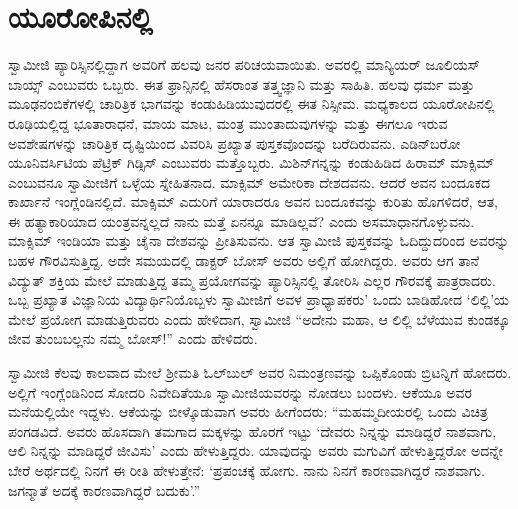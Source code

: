 
\chapter{ಯೂರೋಪಿನಲ್ಲಿ}

 ಸ್ವಾಮೀಜಿ ಪ್ಯಾರಿಸ್ಸಿನಲ್ಲಿದ್ದಾಗ ಅವರಿಗೆ ಹಲವು ಜನರ ಪರಿಚಯವಾಯಿತು. ಅವರಲ್ಲಿ ಮಾನ್ಯಿಯರ್ ಜೂಲಿಯಸ್ ಬಾಯ್ಸ್ ಎಂಬುವರು ಒಬ್ಬರು. ಈತ ಫ್ರಾನ್ಸಿನಲ್ಲಿ ಹೆಸರಾಂತ ತತ್ತ್ವಜ್ಞಾನಿ ಮತ್ತು ಸಾಹಿತಿ. ಹಲವು ಧರ್ಮ ಮತ್ತು ಮೂಢನಂಬಿಕೆಗಳಲ್ಲಿ ಚಾರಿತ್ರಿಕ ಭಾಗವನ್ನು ಕಂಡುಹಿಡಿಯುವುದರಲ್ಲಿ ಈತ ನಿಸ್ಸೀಮ. ಮಧ್ಯಕಾಲದ ಯೂರೋಪಿನಲ್ಲಿ ರೂಢಿಯಲ್ಲಿದ್ದ ಭೂತಾರಾಧನೆ, ಮಾಯ ಮಾಟ, ಮಂತ್ರ ಮುಂತಾದುವುಗಳನ್ನು ಮತ್ತು ಈಗಲೂ ಇರುವ ಅವಶೇಷಗಳನ್ನು ಚಾರಿತ್ರಿಕ ದೃಷ್ಟಿಯಿಂದ ವಿವರಿಸಿ ಪ್ರಖ್ಯಾತ ಪುಸ್ತಕವೊಂದನ್ನು ಬರೆದಿರುವನು. ಎಡಿನ್‍ಬರೋ ಯೂನಿವರ್ಸಿಟಿಯ ಪೆಟ್ರಿಕ್ ಗಿಡ್ಸಿಸ್ ಎಂಬುವರು ಮತ್ತೊಬ್ಬರು. ಮಿಶಿನ್‍ಗನ್ನನ್ನು ಕಂಡುಹಿಡಿದ ಹಿರಾಮ್ ಮಾಕ್ಸಿಮ್ ಎಂಬುವನೂ ಸ್ವಾಮೀಜಿಗೆ ಒಳ್ಳೆಯ ಸ್ನೇಹಿತನಾದ. ಮಾಕ್ಸಿಮ್ ಅಮೇರಿಕಾ ದೇಶದವನು. ಆದರೆ ಅವನ ಬಂದೂಕದ ಕಾರ್ಖಾನೆ ಇಂಗ್ಲೆಂಡಿನಲ್ಲಿದೆ. ಮಾಕ್ಸಿಮ್ ಎದುರಿಗೆ ಯಾರಾದರೂ ಅವನ ಬಂದೂಕವನ್ನು ಕುರಿತು ಹೊಗಳಿದರೆ, ಆತ, ಈ ಹತ್ಯಾಕಾರಿಯಾದ ಯಂತ್ರವನ್ನಲ್ಲದೆ ನಾನು ಮತ್ತೆ ಏನನ್ನೂ ಮಾಡಿಲ್ಲವೆ? ಎಂದು ಅಸಮಾಧಾನಗೊಳ್ಳುವನು. ಮಾಕ್ಸಿಮ್ ಇಂಡಿಯಾ ಮತ್ತು ಚೈನಾ ದೇಶವನ್ನು ಪ್ರೀತಿಸುವನು. ಆತ ಸ್ವಾಮೀಜಿ ಪುಸ್ತಕವನ್ನು ಓದಿದ್ದುದರಿಂದ ಅವರನ್ನು ಬಹಳ ಗೌರವಿಸುತ್ತಿದ್ದ. ಅದೇ ಸಮಯದಲ್ಲಿ ಡಾಕ್ಟರ್ ಬೋಸ್ ಅವರು ಅಲ್ಲಿಗೆ ಹೋಗಿದ್ದರು. ಅವರು ಆಗ ತಾನೆ ವಿದ್ಯುತ್ ಶಕ್ತಿಯ ಮೇಲೆ ಮಾಡುತ್ತಿದ್ದ ತಮ್ಮ ಪ್ರಯೋಗವನ್ನು ಪ್ಯಾರಿಸ್ಸಿನಲ್ಲಿ ತೋರಿಸಿ ಎಲ್ಲರ ಗೌರವಕ್ಕೆ ಪಾತ್ರರಾದರು. ಒಬ್ಬ ಪ್ರಖ್ಯಾತ ವಿಜ್ಞಾನಿಯ ವಿದ್ಯಾರ್ಥಿನಿಯೊಬ್ಬಳು ಸ್ವಾಮೀಜಿಗೆ ಅವಳ ಪ್ರಾಧ್ಯಾಪಕರು' ಒಂದು ಬಾಡಿಹೋದ ‘ಲಿಲ್ಲಿ’ಯ ಮೇಲೆ ಪ್ರಯೋಗ ಮಾಡುತ್ತಿರುವರು ಎಂದು ಹೇಳಿದಾಗ, ಸ್ವಾಮೀಜಿ “ಅದೇನು ಮಹಾ, ಆ ಲಿಲ್ಲಿ ಬೆಳೆಯುವ ಕುಂಡಕ್ಕೂ ಜೀವ ತುಂಬಬಲ್ಲನು ನಮ್ಮ ಬೋಸ್!” ಎಂದು ಹೇಳಿದರು.

 ಸ್ವಾಮೀಜಿ ಕೆಲವು ಕಾಲವಾದ ಮೇಲೆ ಶ‍್ರೀಮತಿ ಓಲ್‍ಬುಲ್ ಅವರ ನಿಮಂತ್ರಣವನ್ನು ಒಪ್ಪಿಕೊಂಡು ಬ್ರಿಟನ್ನಿಗೆ ಹೋದರು. ಅಲ್ಲಿಗೆ ಇಂಗ್ಲೆಂಡಿನಿಂದ ಸೋದರಿ ನಿವೇದಿತೆಯೂ ಸ್ವಾಮೀಜಿಯವರನ್ನು ನೋಡಲು ಬಂದಳು. ಆಕೆಯೂ ಅವರ ಮನೆಯಲ್ಲಿಯೇ ಇದ್ದಳು. ಆಕೆಯನ್ನು ಬೀಳ್ಕೊಡುವಾಗ ಅವರು ಹೀಗೆಂದರು: “ಮಹಮ್ಮದೀಯರಲ್ಲಿ ಒಂದು ವಿಚಿತ್ರ ಪಂಗಡವಿದೆ. ಅವರು ಹೊಸದಾಗಿ ತಮಗಾದ ಮಕ್ಕಳನ್ನು ಹೊರಗೆ ಇಟ್ಟು ‘ದೇವರು ನಿನ್ನನ್ನು ಮಾಡಿದ್ದರೆ ನಾಶವಾಗು, ಆಲಿ ನಿನ್ನನ್ನು ಮಾಡಿದ್ದರೆ ಜೀವಿಸು’ ಎಂದು ಹೇಳುತ್ತಿದ್ದರು. ಯಾವುದನ್ನು ಅವರು ಮಗುವಿಗೆ ಹೇಳುತ್ತಿದ್ದರೋ ಅದನ್ನೇ ಬೇರೆ ಅರ್ಥದಲ್ಲಿ ನಿನಗೆ ಈ ರೀತಿ ಹೇಳುತ್ತೇನೆ: ‘ಪ್ರಪಂಚಕ್ಕೆ ಹೋಗು. ನಾನು ನಿನಗೆ ಕಾರಣವಾಗಿದ್ದರೆ ನಾಶವಾಗು. ಜಗನ್ಮಾತೆ ಅದಕ್ಕೆ ಕಾರಣವಾಗಿದ್ದರೆ ಬದುಕು’.” 


